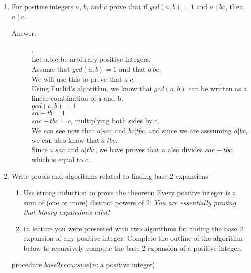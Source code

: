 \documentclass[12pt, oneside]{article}
\begin{document}
\begin{enumerate}
            \item For positive integers $a$, $b$, and $c$ prove that if $gcd(a,b)=1$ and $a \mid bc$, then $a \mid c$.
            
            \begin{description}
                \item[Answer:] .\\
                Let a,b,c be arbitrary positive integers.\\
                Assume that $gcd(a,b) = 1$ and that $a|bc$. \\
                We will use this to prove that $a|c$. \\

                Using Euclid's algorithm, we know that $gcd(a,b)$ can be written as a linear combination of a and b. \\
                $gcd(a,b) = 1$ \\
                $sa + tb = 1$ \\
                $sac + tbc = c$, multiplying both sides by c. \\
                We can see now that $a | sac$ and $bc | tbc$, and since we are asssuming $a|bc$, we can also know that $a|tbc$.\\
                Since $a|sac$ and $a|tbc$, we have proves that a also divides $sac+tbc$, which is equal to c.
            \end{description}

            \item Write proofs and algorithms related to finding base 2 expansions
            \begin{enumerate}
                \item  Use strong induction to prove the theorem: Every positive integer is a sum of (one or more) distinct powers of $2$. {\it You are essentially proving that binary expansions exist!}
                
                \item In lecture you were presented with two algorithms for finding the base $2$ expansion of any positive integer. Complete the outline of the algorithm below to  recursively compute the base 2 expansion of a positive integer. 
                \end{enumerate}
                    
\begin{algorithm}[caption={Algorithm: Calculating base $2$ expansion recursively}]
procedure $\textit{base2recursive}$($n$: a positive integer)


\end{algorithm}
\end{enumerate}
\end{document}
